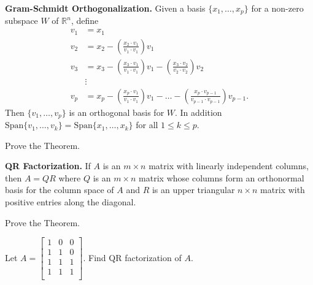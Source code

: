 \begin{enumerate}
\vfill

\newpage

{\bf Gram-Schmidt Orthogonalization.} Given a basis $\{x_1, \dots, x_p\}$ for a non-zero subspace $W$ of $\mathbb{R}^n$, define 
\begin{align*}
v_1 & = x_1\\
v_2 & = x_2 - \left( \frac{x_2 \cdot v_1}{v_1 \cdot v_1} \right) v_1\\
v_3 & = x_3 -\left( \frac{x_3 \cdot v_1}{v_1 \cdot v_1} \right) v_1-\left( \frac{x_3 \cdot v_2}{v_2 \cdot v_2} \right) v_2\\
&\vdots\\
v_p & = x_p -\left( \frac{x_p \cdot v_1}{v_1 \cdot v_1} \right) v_1-\dots -\left( \frac{x_p \cdot v_{p-1}}{v_{p-1} \cdot v_{p-1}} \right) v_{p-1}.
\end{align*}
Then $\{v_1, \dots, v_p\}$ is an orthogonal basis for $W$. In addition $\text{Span}\{v_1,\dots, v_k\}=\text{Span}\{ x_1, \dots, x_k\}$ for all $1 \leq k \leq p$.

\Problem Prove the Theorem.

\vfill

{\bf QR Factorization.} If $A$ is an $m\times n$ matrix with linearly independent columns, then $A=QR$ where $Q$ is an $m\times n$ matrix whose columns form an orthonormal basis for the column space of $A$ and $R$ is an upper triangular $n \times n$ matrix with positive entries along the diagonal. 

\Problem Prove the Theorem.

\vfill

\newpage

\Problem Let $A=\begin{bmatrix} 1 & 0 & 0\\ 1 & 1 & 0\\ 1 & 1 & 1\\ 1 & 1 & 1\\ \end{bmatrix}$. Find QR factorization of $A$.



\end{enumerate}


